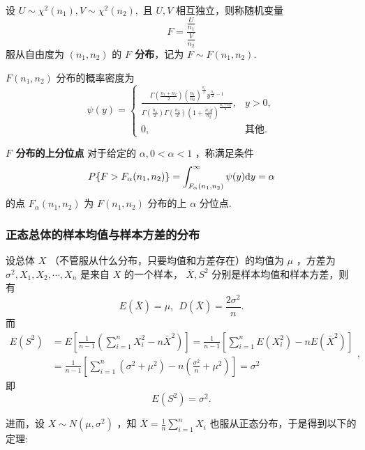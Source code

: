 \documentclass[UTF8,10pt]{ctexart}
\begin{document}
	设 $ U \sim \chi ^{2}(n_{1}),V \sim \chi ^{2}(n_{2}), $ 且 $ U,V $ 相互独立，则称随机变量 $$ F= \frac{ \frac{U}{n_{1}} }{ \frac{V}{n_{2}} } $$ 服从自由度为 $ (n_{1},n_{2}) $ 的 \textbf{ $ F $ 分布}，记为 $ F \sim F(n_{1},n_{2}). $
	
	$ F(n_{1},n_{2}) $ 分布的概率密度为 $$ \psi (y)= \begin{cases} \frac{ \Gamma ( \frac{n_{1}+n_{2}}{2} ) ( \frac{n_{1}}{n_{2}} )^{ \frac{n_{1}}{2} }y^{ \frac{n_{1}}{2} -1} }{ \Gamma ( \frac{n_{1}}{2} ) \Gamma ( \frac{n_{2}}{2} ) (1+ \frac{n_{1}y}{n_{2}} )^{ \frac{n_{1}+n_{2}}{2} } }, & y>0, \\ 0, & \mbox{其他.} \end{cases} $$
	
	\textbf{ $ F $ 分布的上分位点} 对于给定的 $ \alpha,0< \alpha <1 $ ，称满足条件 $$ P\{F>F_{ \alpha }(n_{1},n_{2})\}= \int_{F_{ \alpha }(n_{1},n_{2})}^{ \infty } \psi (y){\rm d}y= \alpha $$ 的点 $ F_{ \alpha }(n_{1},n_{2}) $ 为 $ F(n_{1},n_{2}) $ 分布的上 $ \alpha $ 分位点.
	
	\subsubsection{正态总体的样本均值与样本方差的分布}
	
	设总体 $ X $ （不管服从什么分布，只要均值和方差存在）的均值为 $ \mu $ ，方差为 $ \sigma ^{2},X_{1},X_{2}, \cdots ,X_{n} $ 是来自 $ X $ 的一个样本， $ \bar{X} ,S^{2} $ 分别是样本均值和样本方差，则有 $$ E( \bar{X} )= \mu,\ \ D( \bar{X} )= \frac{2 \sigma ^{2} }{n}. $$ 而 $$ \begin{aligned} E(S^{2}) & =E[ \frac{1}{n-1} ( \sum\limits_{i=1}^{n}X_{i}^{2}-n \bar{X} ^{2} ) ]= \frac{1}{n-1}[ \sum\limits_{i=1}^{n} E(X_{i}^{2})-nE( \bar{X} ^{2} ) ]\\ & = \frac{1}{n-1} [ \sum\limits_{i=1}^{n}( \sigma ^{2}+ \mu ^{2} )-n( \frac{ \sigma ^{2}}{n} + \mu ^{2} ) ]= \sigma ^{2} \end{aligned}, $$ 即 $$ E(S^{2})= \sigma ^{2}. $$
	
	进而，设 $ X \sim N( \mu , \sigma ^{2} ) $ ，知 $ \bar{X}= \frac{1}{n} \sum\limits_{i=1}^{n}X_{i} $ 也服从正态分布，于是得到以下的定理:
	
\end{document}
